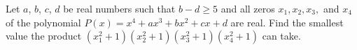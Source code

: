 Let $a$,  $b$,  $c$,  $d$ be real numbers such that $b-d \ge 5$ and all zeros $x_1, x_2, x_3,$ and $x_4$ of the polynomial $P(x)=x^4+ax^3+bx^2+cx+d$ are real. Find the smallest value the product $(x_1^2+1)(x_2^2+1)(x_3^2+1)(x_4^2+1)$ can take.